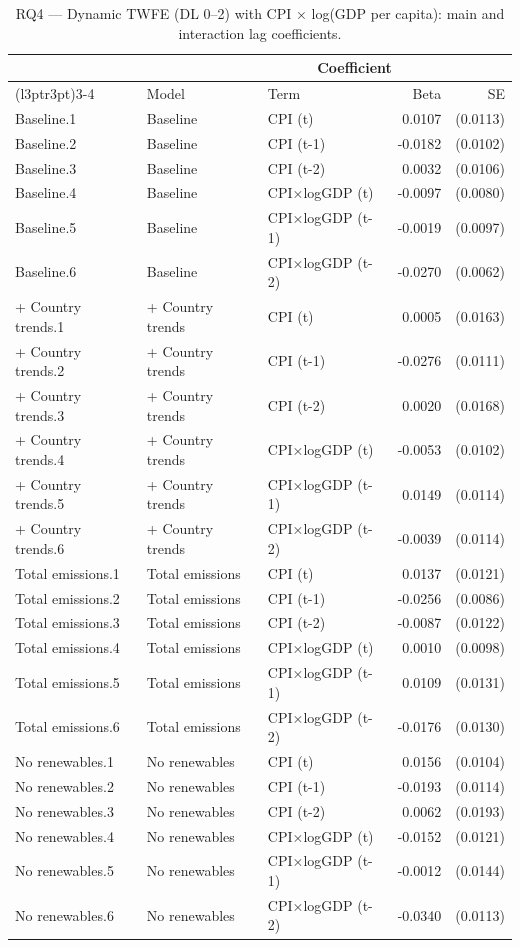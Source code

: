 \begin{table}
\centering
\caption{\label{tab:tab:rq4_dl_interaction}RQ4 — Dynamic TWFE (DL 0–2) with CPI × log(GDP per capita): main and interaction lag coefficients.}
\centering
\begin{tabular}[t]{lllrr}
\toprule
\multicolumn{1}{c}{ } & \multicolumn{1}{c}{ } & \multicolumn{2}{c}{Coefficient} \\
\cmidrule(l{3pt}r{3pt}){3-4}
  & Model & Term & Beta & SE\\
\midrule
Baseline.1 & Baseline & CPI (t) & 0.0107 & (0.0113)\\
Baseline.2 & Baseline & CPI (t-1) & -0.0182 & (0.0102)\\
Baseline.3 & Baseline & CPI (t-2) & 0.0032 & (0.0106)\\
Baseline.4 & Baseline & CPI×logGDP (t) & -0.0097 & (0.0080)\\
Baseline.5 & Baseline & CPI×logGDP (t-1) & -0.0019 & (0.0097)\\
\addlinespace
Baseline.6 & Baseline & CPI×logGDP (t-2) & -0.0270 & (0.0062)\\
+ Country trends.1 & + Country trends & CPI (t) & 0.0005 & (0.0163)\\
+ Country trends.2 & + Country trends & CPI (t-1) & -0.0276 & (0.0111)\\
+ Country trends.3 & + Country trends & CPI (t-2) & 0.0020 & (0.0168)\\
+ Country trends.4 & + Country trends & CPI×logGDP (t) & -0.0053 & (0.0102)\\
\addlinespace
+ Country trends.5 & + Country trends & CPI×logGDP (t-1) & 0.0149 & (0.0114)\\
+ Country trends.6 & + Country trends & CPI×logGDP (t-2) & -0.0039 & (0.0114)\\
Total emissions.1 & Total emissions & CPI (t) & 0.0137 & (0.0121)\\
Total emissions.2 & Total emissions & CPI (t-1) & -0.0256 & (0.0086)\\
Total emissions.3 & Total emissions & CPI (t-2) & -0.0087 & (0.0122)\\
\addlinespace
Total emissions.4 & Total emissions & CPI×logGDP (t) & 0.0010 & (0.0098)\\
Total emissions.5 & Total emissions & CPI×logGDP (t-1) & 0.0109 & (0.0131)\\
Total emissions.6 & Total emissions & CPI×logGDP (t-2) & -0.0176 & (0.0130)\\
No renewables.1 & No renewables & CPI (t) & 0.0156 & (0.0104)\\
No renewables.2 & No renewables & CPI (t-1) & -0.0193 & (0.0114)\\
\addlinespace
No renewables.3 & No renewables & CPI (t-2) & 0.0062 & (0.0193)\\
No renewables.4 & No renewables & CPI×logGDP (t) & -0.0152 & (0.0121)\\
No renewables.5 & No renewables & CPI×logGDP (t-1) & -0.0012 & (0.0144)\\
No renewables.6 & No renewables & CPI×logGDP (t-2) & -0.0340 & (0.0113)\\
\bottomrule
\end{tabular}
\end{table}